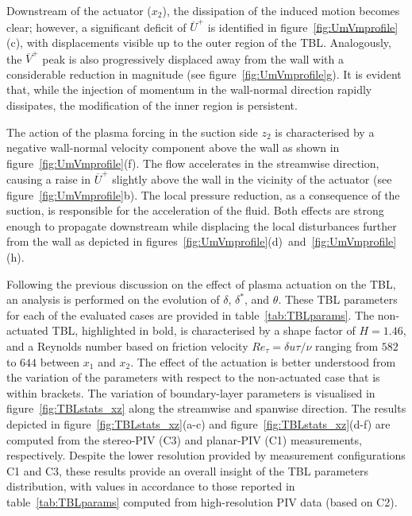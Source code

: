 Downstream of the actuator ($x_2$), the dissipation of the induced motion becomes clear; however, a significant deficit of $\overline{U}^+$ is identified in figure~\ref{fig:UmVmprofile}(c), with displacements visible up to the outer region of the TBL. Analogously, the $\overline{V}^+$ peak is also progressively displaced away from the wall with a considerable reduction in magnitude (see figure~\ref{fig:UmVmprofile}g). It is evident that, while the injection of momentum in the wall-normal direction rapidly dissipates, the modification of the inner region is persistent.

The action of the plasma forcing in the suction side $z_2$
is characterised by a negative wall-normal velocity component above the wall as shown in figure~\ref{fig:UmVmprofile}(f). The flow accelerates in the streamwise direction, causing a raise in $\overline{U}^+$ slightly above the wall in the vicinity of the actuator (see figure~\ref{fig:UmVmprofile}b). The local pressure reduction, as a consequence of the suction, is responsible for the acceleration of the fluid. Both effects are strong enough to propagate downstream while displacing the local disturbances further from the wall as depicted in figures~\ref{fig:UmVmprofile}(d)~and~\ref{fig:UmVmprofile}(h).

Following the previous discussion on the effect of plasma actuation on the TBL, an analysis is performed on the evolution of $\delta$, $\delta^*$, and $\theta$. These TBL parameters for each of the evaluated cases are provided in table~\ref{tab:TBLparams}. The non-actuated TBL, highlighted in bold, is characterised by a shape factor of $H=1.46$, and a Reynolds number based on friction velocity $Re_\tau=\delta u\tau/\nu$ ranging from $582$ to $644$ between $x_1$ and $x_2$. The effect of the actuation is better understood from the variation of the parameters with respect to the non-actuated case that is within brackets. The variation of boundary-layer parameters is visualised in figure~\ref{fig:TBLstats_xz} along the streamwise and spanwise direction. The results depicted in figure~\ref{fig:TBLstats_xz}(a-c) and figure~\ref{fig:TBLstats_xz}(d-f) are computed from the stereo-PIV (C3) and planar-PIV (C1) measurements, respectively. Despite the lower resolution provided by measurement configurations C1 and C3, these results provide an overall insight of the TBL parameters distribution, with values in accordance to those reported in table~\ref{tab:TBLparams} computed from high-resolution PIV data (based on C2).

